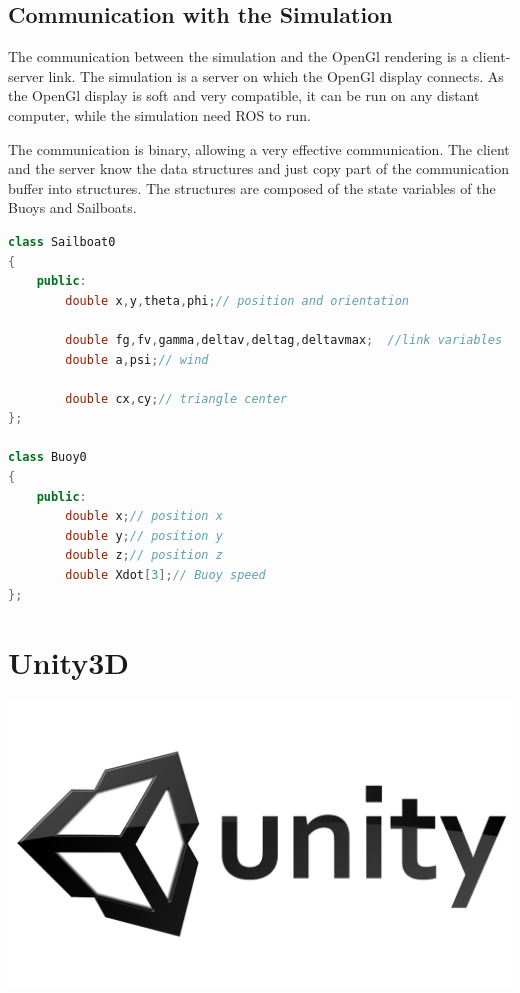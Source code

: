 \documentclass[a4paper]{report}
\begin{document}
\subsection{Communication with the Simulation}

The communication between the simulation and the OpenGl rendering is a client-server link. The simulation is a server on which the OpenGl display connects. As the OpenGl display is soft and very compatible, it can be run on any distant computer, while the simulation need ROS to run.

The communication is binary, allowing a very effective communication. The client and the server know the data structures and just copy part of the communication buffer into structures. The structures are composed of the state variables of the Buoys and Sailboats.

\renewcommand{\lstlistingname}{Code}
\begin{lstlisting}[language=C++, caption={display opengl communication structures}, frame=single]
class Sailboat0
{	
    public:	
        double x,y,theta,phi;// position and orientation
	
        double fg,fv,gamma,deltav,deltag,deltavmax;  //link variables
        double a,psi;// wind            
            
        double cx,cy;// triangle center
};

class Buoy0
{
    public:
        double x;// position x
        double y;// position y
        double z;// position z
        double Xdot[3];// Buoy speed
};
\end{lstlisting}

\section{Unity3D}
\begin{center}
\includegraphics[scale=0.05]{image/unity-logo.png}
\end{center}
\end{document}
